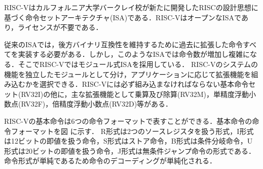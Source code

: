 
RISC-Vはカルフォルニア大学バークレイ校が新たに開発したRISCの設計思想に基づく命令セットアーキテクチャ(ISA)である．RISC-VはオープンなISAであり，ライセンスが不要である．

従来のISAでは，後方バイナリ互換性を維持するために過去に拡張した命令すべてを実装する必要がある．しかし，このようなISAでは命令数が増加し複雑になる．そこでRISC-Vではモジュール式ISAを採用している．\cite{bib:risc-v-module}
RISC-Vのシステムの機能を独立したモジュールとして分け，アプリケーションに応じて拡張機能を組み込むかを選択できる．RISC-Vには必ず組み込まなければならない基本命令セット(RV32I)の他に，主な拡張機能として乗算及び除算(RV32M)，単精度浮動小数点(RV32F)，倍精度浮動小数点(RV32D)等がある．

RISC-Vの基本命令は6つの命令フォーマットで表すことができる．基本命令の命令フォーマットを図%
に示す．
R形式は2つのソースレジスタを扱う形式，I形式は12ビットの即値を扱う命令，S形式はストア命令，B形式は条件分岐命令，U形式は20ビットの即値を扱う命令，J形式は無条件ジャンプ命令の形式である．命令形式が単純であるため命令のデコーディングが単純化される．